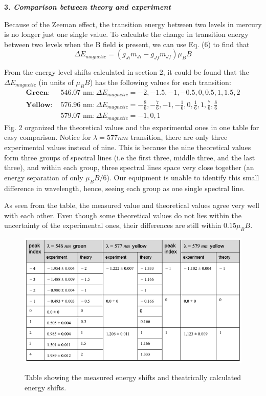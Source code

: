 \documentclass[11pt]{article}
\begin{document}
\textbf{3. \textit{Comparison between theory and experiment}}
\smallskip

Because of the Zeeman effect, the transition energy between two levels in mercury is no longer just one single value. To calculate the change in transition energy between two levels when the B field is present, we can use Eq. (6) to find that 
$$ \Delta E_{magnetic} = (g_{Ji} m_{Ji} - g_{Jf} m_{Jf}) \mu_B B $$

From the energy level shifts calculated in section 2, it could be found that the $\Delta E_{magnetic}$ (in units of $\mu_B B$) has the following values for each transition:
\begin{align*}
\textbf{Green: }& 546.07 \text{ nm}: \Delta E_{magnetic} = -2, -1.5, -1, -0.5, 0, 0.5, 1, 1.5, 2 \\
\textbf{Yellow: }&576.96 \text{ nm}: \Delta E_{magnetic} = -\frac{8}{6}, -\frac{7}{6}, -1, -\frac{1}{6}, 0, \frac{1}{6}, 1, \frac{7}{6}, \frac{8}{6} \\
& 579.07 \text{ nm}: \Delta E_{magnetic} = -1, 0 ,1
\end{align*} 
Fig. 2 organized the theoretical values and the experimental ones in one table for easy comparison. Notice for $\lambda =577nm$ transition, there are only three experimental values instead of nine. This is because the nine theoretical values form three groups of spectral lines (i.e the first three, middle three, and the last three), and within each group, three spectral lines space very close together (an energy separation of only $\mu_B B /6$). Our equipment is unable to identify this small difference in wavelength, hence, seeing each group as one single spectral line.

As seen from the table, the measured value and theoretical values agree very well with each other. Even though some theoretical values do not lies within the uncertainty of the experimental ones, their differences are still within $0.15 \mu_B B$.


\begin{figure}[H]
\begin{center}
\includegraphics[width=15cm]{energies}
\label{Fig. 2}
\caption{Table showing the measured energy shifts and theatrically calculated energy shifts. }
\end{center}
\end{figure}
 
\end{document}
